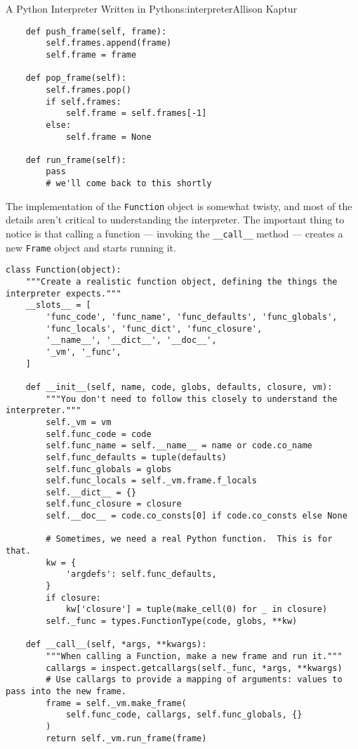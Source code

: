 \begin{aosachapter}{A Python Interpreter Written in Python}{s:interpreter}{Allison Kaptur}
\begin{verbatim}
    def push_frame(self, frame):
        self.frames.append(frame)
        self.frame = frame

    def pop_frame(self):
        self.frames.pop()
        if self.frames:
            self.frame = self.frames[-1]
        else:
            self.frame = None

    def run_frame(self):
        pass
        # we'll come back to this shortly
\end{verbatim}

\label{the-function-class}

The implementation of the \texttt{Function} object is somewhat twisty,
and most of the details aren't critical to understanding the
interpreter. The important thing to notice is that calling a function
--- invoking the \texttt{\_\_call\_\_} method --- creates a new
\texttt{Frame} object and starts running it.

\begin{verbatim}
class Function(object):
    """Create a realistic function object, defining the things the interpreter expects."""
    __slots__ = [
        'func_code', 'func_name', 'func_defaults', 'func_globals',
        'func_locals', 'func_dict', 'func_closure',
        '__name__', '__dict__', '__doc__',
        '_vm', '_func',
    ]

    def __init__(self, name, code, globs, defaults, closure, vm):
        """You don't need to follow this closely to understand the interpreter."""
        self._vm = vm
        self.func_code = code
        self.func_name = self.__name__ = name or code.co_name
        self.func_defaults = tuple(defaults)
        self.func_globals = globs
        self.func_locals = self._vm.frame.f_locals
        self.__dict__ = {}
        self.func_closure = closure
        self.__doc__ = code.co_consts[0] if code.co_consts else None

        # Sometimes, we need a real Python function.  This is for that.
        kw = {
            'argdefs': self.func_defaults,
        }
        if closure:
            kw['closure'] = tuple(make_cell(0) for _ in closure)
        self._func = types.FunctionType(code, globs, **kw)

    def __call__(self, *args, **kwargs):
        """When calling a Function, make a new frame and run it."""
        callargs = inspect.getcallargs(self._func, *args, **kwargs)
        # Use callargs to provide a mapping of arguments: values to pass into the new frame.
        frame = self._vm.make_frame(
            self.func_code, callargs, self.func_globals, {}
        )
        return self._vm.run_frame(frame)


\end{verbatim}
\end{aosachapter}
